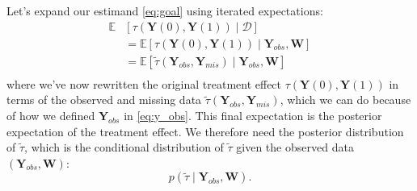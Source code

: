 \documentclass[10pt,a4paper]{article}
\begin{document}
Let's expand our estimand \eqref{eq:goal} using iterated expectations:
\begin{align*}
	\mathbb{E}&[\tau(\mathbf{Y}(0), \mathbf{Y}(1)) \mid \mathcal{D}] \\[3pt]
	&= \mathbb{E}[\tau(\mathbf{Y}(0), \mathbf{Y}(1)) \mid \mathbf{Y}_{obs}, \mathbf{W}] \\[3pt]
	&= \mathbb{E} [ \tilde{\tau}(\mathbf{Y}_{obs}, \mathbf{Y}_{mis}) \mid \mathbf{Y}_{obs}, \mathbf{W} ] \\[3pt]
\end{align*}
where we've now rewritten the original treatment effect $\tau(\mathbf{Y}(0), \mathbf{Y}(1))$ in terms of the observed and missing data $\tilde{\tau}(\mathbf{Y}_{obs}, \mathbf{Y}_{mis})$, which we can do because of how we defined $\mathbf{Y}_{obs}$ in \eqref{eq:y_obs}. This final expectation is the posterior expectation of the treatment effect. We therefore need the posterior distribution of $\tilde{\tau}$, which is the conditional distribution of $\tilde{\tau}$ given the observed data $(\mathbf{Y}_{obs}, \mathbf{W})$:
\begin{equation}\label{eq:tau_posterior}
	p(\tilde{\tau} \mid \mathbf{Y}_{obs}, \mathbf{W}).
\end{equation}
\end{document}

